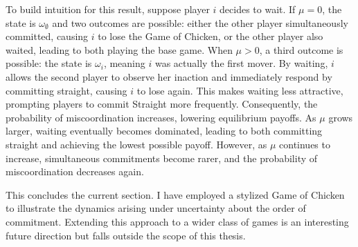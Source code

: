 \documentclass[main.tex]{subfiles}
\begin{document}
\newline
To build intuition for this result, suppose player $i$ decides to wait. If $\mu = 0$, the state is $\omega_\emptyset$ and two outcomes are possible: either the other player simultaneously committed, causing $i$ to lose the Game of Chicken, or the other player also waited, leading to both playing the base game. When $\mu > 0$, a third outcome is possible: the state is $\omega_i$, meaning $i$ was actually the first mover. By waiting, $i$ allows the second player to observe her inaction and immediately respond by committing straight, causing $i$ to lose again. This makes waiting less attractive, prompting players to commit Straight more frequently. Consequently, the probability of miscoordination increases, lowering equilibrium payoffs. As $\mu$ grows larger, waiting eventually becomes dominated, leading to both committing straight and achieving the lowest possible payoff. However, as $\mu$ continues to increase, simultaneous commitments become rarer, and the probability of miscoordination decreases again.
 
This concludes the current section. I have employed a stylized Game of Chicken to illustrate the dynamics arising under uncertainty about the order of commitment. Extending this approach to a wider class of games is an interesting future direction but falls outside the scope of this thesis.
 
\end{document}
